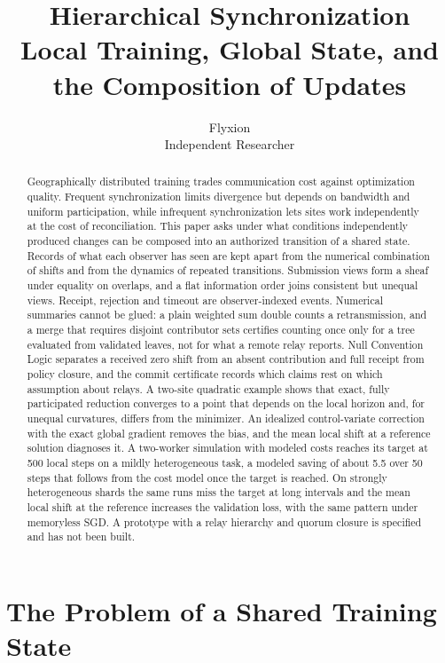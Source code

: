 \documentclass[11pt]{article}
\title{Hierarchical Synchronization\\[0.4em]
\large Local Training, Global State, and the Composition of Updates}
\author{Flyxion\\Independent Researcher}
\date{}
\theoremstyle{definition}
\theoremstyle{remark}
\begin{document}
\maketitle

\begin{abstract}
Geographically distributed training trades communication cost against optimization quality. Frequent synchronization limits divergence but depends on bandwidth and uniform participation, while infrequent synchronization lets sites work independently at the cost of reconciliation. This paper asks under what conditions independently produced changes can be composed into an authorized transition of a shared state. Records of what each observer has seen are kept apart from the numerical combination of shifts and from the dynamics of repeated transitions. Submission views form a sheaf under equality on overlaps, and a flat information order joins consistent but unequal views. Receipt, rejection and timeout are observer-indexed events. Numerical summaries cannot be glued: a plain weighted sum double counts a retransmission, and a merge that requires disjoint contributor sets certifies counting once only for a tree evaluated from validated leaves, not for what a remote relay reports. Null Convention Logic separates a received zero shift from an absent contribution and full receipt from policy closure, and the commit certificate records which claims rest on which assumption about relays. A two-site quadratic example shows that exact, fully participated reduction converges to a point that depends on the local horizon and, for unequal curvatures, differs from the minimizer. An idealized control-variate correction with the exact global gradient removes the bias, and the mean local shift at a reference solution diagnoses it. A two-worker simulation with modeled costs reaches its target at 500 local steps on a mildly heterogeneous task, a modeled saving of about 5.5 over 50 steps that follows from the cost model once the target is reached. On strongly heterogeneous shards the same runs miss the target at long intervals and the mean local shift at the reference increases the validation loss, with the same pattern under memoryless SGD. A prototype with a relay hierarchy and quorum closure is specified and has not been built.
\end{abstract}

\section{The Problem of a Shared Training State}
\end{document}
